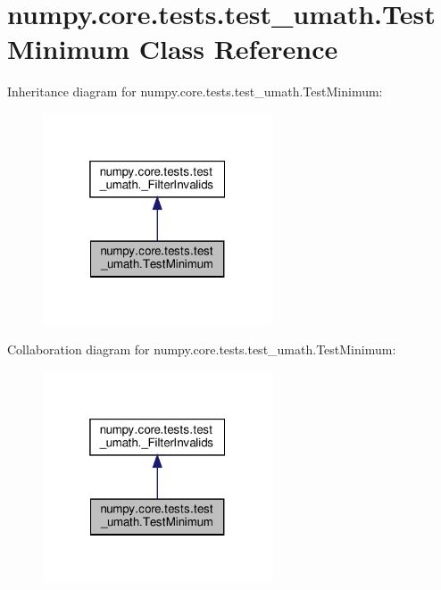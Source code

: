 \hypertarget{classnumpy_1_1core_1_1tests_1_1test__umath_1_1TestMinimum}{}\section{numpy.\+core.\+tests.\+test\+\_\+umath.\+Test\+Minimum Class Reference}
\label{classnumpy_1_1core_1_1tests_1_1test__umath_1_1TestMinimum}


Inheritance diagram for numpy.\+core.\+tests.\+test\+\_\+umath.\+Test\+Minimum\+:
\nopagebreak
\begin{figure}[H]
\begin{center}
\leavevmode
\includegraphics[width=193pt]{classnumpy_1_1core_1_1tests_1_1test__umath_1_1TestMinimum__inherit__graph}
\end{center}
\end{figure}


Collaboration diagram for numpy.\+core.\+tests.\+test\+\_\+umath.\+Test\+Minimum\+:
\nopagebreak
\begin{figure}[H]
\begin{center}
\leavevmode
\includegraphics[width=193pt]{classnumpy_1_1core_1_1tests_1_1test__umath_1_1TestMinimum__coll__graph}
\end{center}
\end{figure}
